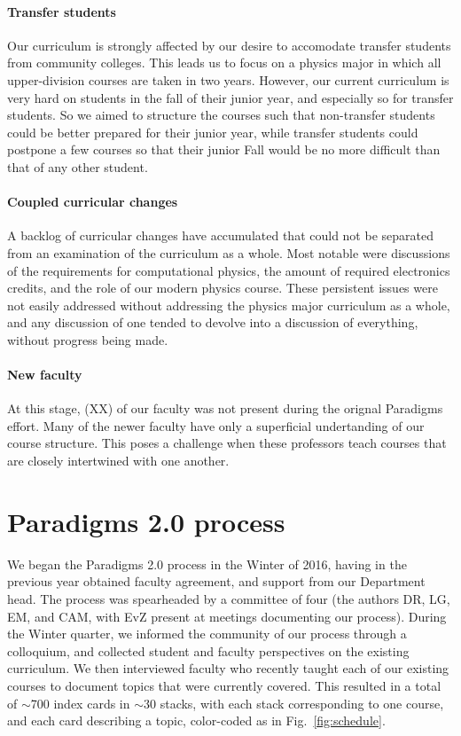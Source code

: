 \documentclass[english,aps,pra,reprint,noshowpacs,superscriptaddress]{revtex4-1}
\begin{document}
\paragraph{Transfer students}
Our curriculum is strongly affected by our desire to accomodate
transfer students from community colleges.  This leads us to focus on
a physics major in which all upper-division courses are taken in two
years.  However, our current curriculum is very hard on students in
the fall of their junior year, and especially so for transfer
students.  So we aimed to structure the courses such that non-transfer
students could be better prepared for their junior year, while
transfer students could postpone a few courses so that their junior
Fall would be no more difficult than that of any other student.

\paragraph{Coupled curricular changes}
A backlog of curricular changes have accumulated that could not be
separated from an examination of the curriculum as a whole.  Most
notable were discussions of the requirements for computational
physics, the amount of required electronics credits, and the role of
our modern physics course.  These persistent issues were not easily
addressed without addressing the physics major curriculum as a whole,
and any discussion of one tended to devolve into a discussion of
everything, without progress being made.

\paragraph{New faculty}
At this stage, (XX) of our faculty was not present during the orignal
Paradigms effort.  Many of the newer faculty have only a superficial
undertanding of our course structure.  This poses a challenge when
these professors teach courses that are closely intertwined with one
another.

\section{Paradigms 2.0 process}
We began the Paradigms 2.0 process in the Winter of 2016, having in
the previous year obtained faculty agreement, and support from our
Department head.  The process was spearheaded by a committee of four
(the authors DR, LG, EM, and CAM, with EvZ present at meetings
documenting our process).  During the Winter quarter, we informed the
community of our process through a colloquium, and collected student
and faculty perspectives on the existing curriculum.  We then
interviewed faculty who recently taught each of our existing courses
to document topics that were currently covered.  This resulted in a
total of $\sim$700 index cards in $\sim$30 stacks, with each stack
corresponding to one course, and each card describing a topic,
color-coded as in Fig.~\ref{fig:schedule}.
\end{document}
